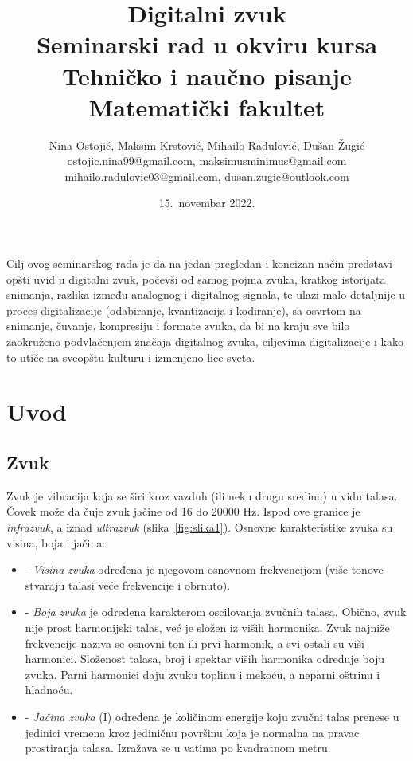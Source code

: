 \documentclass[a4paper]{article}
\begin{document}
\title{Digitalni zvuk\\ \small{Seminarski rad u okviru kursa\\Tehničko i naučno pisanje\\ Matematički fakultet}}

\author{Nina Ostojić, Maksim Krstović, Mihailo Radulović, Dušan Žugić\\ostojic.nina99@gmail.com, maksimusminimus@gmail.com\\ mihailo.radulovic03@gmail.com, dusan.zugic@outlook.com}
\date{15.~novembar 2022.}
\maketitle

\abstract
Cilj ovog seminarskog rada je da na jedan pregledan i koncizan način predstavi opšti uvid u digitalni zvuk, počevši od samog pojma zvuka, kratkog istorijata snimanja, razlika između analognog i digitalnog signala, te ulazi malo detaljnije u proces digitalizacije (odabiranje, kvantizacija i kodiranje), sa osvrtom na snimanje, čuvanje, kompresiju i formate zvuka, da bi na kraju sve bilo zaokruženo podvlačenjem značaja digitalnog zvuka, ciljevima digitalizacije i kako to utiče na sveopštu kulturu i izmenjeno lice sveta.

\tableofcontents

\newpage

\section{Uvod}
    \subsection{Zvuk}
    Zvuk je vibracija koja se širi kroz vazduh (ili neku drugu sredinu) u vidu talasa. Čovek može da čuje zvuk jačine od 16 do 20000 Hz. Ispod ove granice je \textit{infrazvuk}, a iznad \textit{ultrazvuk} (slika~\ref{fig:slika1}). Osnovne karakteristike zvuka su visina, boja i jačina:
    \begin {itemize}
        \item[-] \textit{Visina zvuka} određena je njegovom osnovnom frekvencijom (više tonove stvaraju talasi
        veće frekvencije i obrnuto).
    
        \item[-] \textit{Boja zvuka} je određena karakterom oscilovanja zvučnih talasa. Obično, zvuk nije prost
        harmonijski talas, već je složen iz viših harmonika. Zvuk najniže frekvencije naziva se osnovni ton ili prvi harmonik, a svi ostali su viši harmonici. Složenost talasa, broj i spektar viših
        harmonika određuje boju zvuka. Parni harmonici daju zvuku toplinu i mekoću, a neparni
        oštrinu i hladnoću.
    
        \item[-] \textit{Jačina zvuka} (I) određena je količinom energije koju zvučni talas prenese u jedinici
        vremena kroz jediničnu površinu koja je normalna na pravac prostiranja talasa. Izražava se
        u vatima po kvadratnom metru\cite{10.17632/rwbs7645hg.n}.
    \end{itemize}
  
\end{document}
